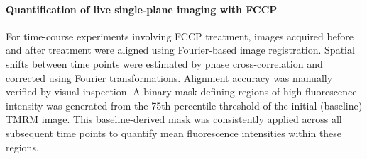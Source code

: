 \paragraph{Quantification of live single-plane imaging with FCCP}
For time-course experiments involving FCCP treatment, images acquired before and after treatment were aligned using Fourier-based image registration. Spatial shifts between time points were estimated by phase cross-correlation and corrected using Fourier transformations. Alignment accuracy was manually verified by visual inspection. A binary mask defining regions of high fluorescence intensity was generated from the 75th percentile threshold of the initial (baseline) TMRM image. This baseline-derived mask was consistently applied across all subsequent time points to quantify mean fluorescence intensities within these regions.